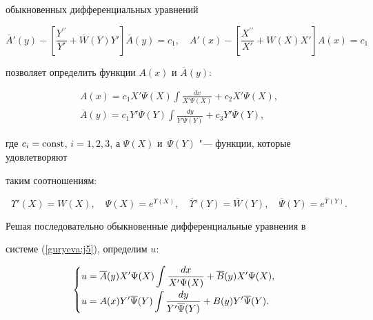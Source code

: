 обыкновенных дифференциальных уравнений


\begin{equation*}


\overline{A}'(y)-\left[ \frac{Y^{\prime


\prime}}{Y'


}+\overline{W}(Y)Y'\right]\overline{A}(y)=c_{1}, \quad


  A'(x)-\left[ \frac{X^{\prime


\prime}}{{X' }}+W(X){X' }\right]A(x)=c_{1}


\end{equation*}


позволяет определить функции $A(x)$ и $\overline{A}(y)$:


\begin{gather*}


A(x)=c_{1}X'\Psi(X) \int \frac{dx}{X'\Psi(X)}+c_{2}X'\Psi(X),\\


\overline{A}(y)=c_{1}Y'\overline{\Psi}(Y) \int \frac{dy}{Y'\overline{\Psi}(Y)}+c_{3}Y'\overline{\Psi}(Y),


\end{gather*}


где $c_{i}= \rm const$, $i=1, 2, 3$, а $\Psi(X)$ и~$\overline{\Psi}(Y)$ "--- функции, которые удовлетворяют


таким соотношениям:


$$


\Upsilon'(X)=W(X), \quad \Psi(X)=e^{\Upsilon(X)}, \quad


\overline{\Upsilon}'(Y)=\overline{W}(Y), \quad


\overline{\Psi}(Y)=e^{\overline{\Upsilon}(Y)}.


$$





Решая последовательно обыкновенные дифференциальные уравнения в


системе (\ref{guryeva:j5}), определим $u$:


\begin{equation*}


\begin{cases}


\displaystyle u=\overline{A}(y) X'\Psi(X)


\int \frac{dx}{X'\Psi(X)}+\overline{B}(y) X'\Psi(X), \vspace{1mm}\\


\displaystyle  u=A(x) Y'\overline{\Psi}(Y)


\int \frac{d y}{Y'\overline{\Psi}(Y)}+B(y) Y'\overline{\Psi}(Y).


\end{cases}


\end{equation*}





